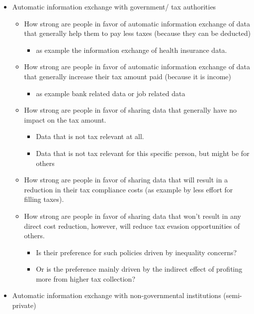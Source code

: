 \documentclass[a4paper, 12pt]{article}
\begin{document}
\begin{itemize}
    \item Automatic information exchange with government/ tax authorities
    \begin{itemize}
        \item How strong are people in favor of automatic information exchange of data that generally help them to pay less taxes (because they can be deducted)
        \begin{itemize}
            \item as example the information exchange of health insurance data. 
        \end{itemize}
        \item How strong are people in favor of automatic information exchange of data that generally increase their tax amount paid (because it is income)
        \begin{itemize}
            \item as example bank related data or job related data 
        \end{itemize}
        \item How strong are people in favor of sharing data that generally have no impact on the tax amount. 
        \begin{itemize}
            \item Data that is not tax relevant at all.
            \item Data that is not tax relevant for this specific person, but might be for others
        \end{itemize}
        \item How strong are people in favor of sharing data that will result in a reduction in their tax compliance costs (as example by less effort for filling taxes).
        \item How strong are people in favor of sharing data that won't result in any direct cost reduction, however, will reduce tax evasion opportunities of others.
        \begin{itemize}
            \item Is their preference for such policies driven by inequality concerns?
            \item Or is the preference mainly driven by the indirect effect of profiting more from higher tax collection?
        \end{itemize} 
    \end{itemize}
    \item Automatic information exchange with non-governmental institutions (semi-private) 

\end{itemize}
\end{document}
